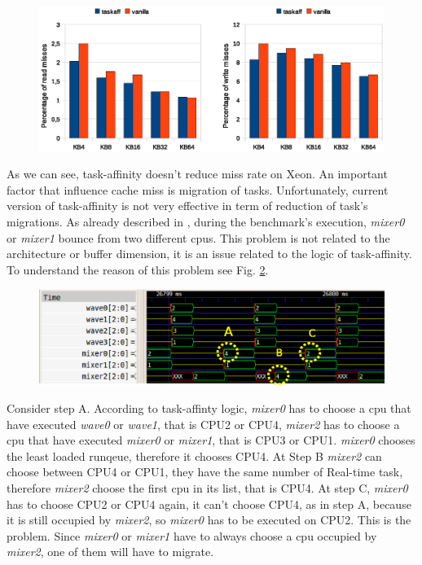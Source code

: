 \begin{figure}[htbp]
 \centering
  \includegraphics[width=\widefigure]{images/cache_miss/l1_load_store_i7.eps}
  \label{fig:l1_load_store_Xeon}
 \caption{}
\end{figure}

As we can see, task-affinity doesn't reduce miss rate on Xeon. An important factor that influence cache miss is migration of tasks. Unfortunately, current 
version of task-affinity is not very effective in term of reduction of task's migrations. As already described in \cite{lcs}, during the benchmark's 
execution, \textit{mixer0} or \textit{mixer1} bounce from two different cpus. This problem is not related to the architecture or buffer dimension, it is 
an issue related to the logic of task-affinity. To understand the reason of this problem see Fig. \ref{fig:migr_pat}. 

\begin{figure}[htbp]
\centering
\includegraphics[width=\widefigure]{images/migr_i7.eps}
\caption{}
\label{fig:migr_pat}
\end{figure}

\newpage
Consider step A. According to task-affinty logic, \textit{mixer0} has to choose a cpu that have executed \textit{wave0} or \textit{wave1}, that is
CPU2 or CPU4, \textit{mixer2} has to choose a cpu that have executed \textit{mixer0} or \textit{mixer1}, that is CPU3 or CPU1. \textit{mixer0} chooses the 
least loaded runqeue, therefore it chooses CPU4. At Step B \textit{mixer2} can choose between CPU4 or CPU1, they have the same number of Real-time task, 
therefore \textit{mixer2} choose the first cpu in its list, that is CPU4. At step C, \textit{mixer0} has to choose CPU2 or CPU4 again, it can't choose CPU4,
as in step A, because it is still occupied by \textit{mixer2}, so \textit{mixer0} has to be executed on CPU2. This is the problem. Since \textit{mixer0} or 
\textit{mixer1} have to always choose a cpu occupied by \textit{mixer2}, one of them will have to migrate.

